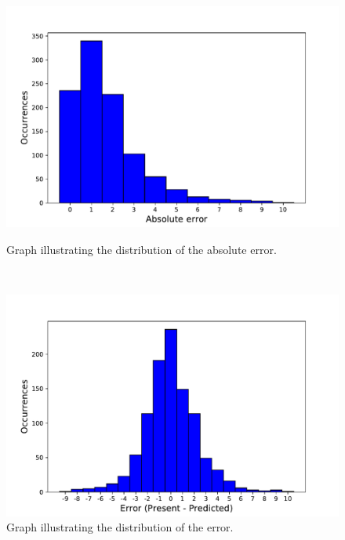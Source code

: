 \begin{figure}[h!]
\begin{minipage}[b]{8.5cm}
\centering
\includegraphics[width=1\textwidth]{images/absoluteerror}
\caption{Graph illustrating the distribution of the absolute error.}
\label{fig:absoluteerror}
\end{minipage}
\ \hspace{2mm} \hspace{3mm} \
\begin{minipage}[b]{8.5cm}
\centering
\includegraphics[width=1\textwidth]{images/errorpres}
\caption{Graph illustrating the distribution of the error.}
\label{fig:errorpres}
\end{minipage}
\end{figure}


